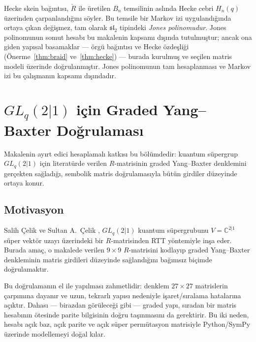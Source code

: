 \documentclass[10pt]{math}
\numberwithin{equation}{section}
\theoremstyle{plain}
\theoremstyle{definition}
\renewcommand{\sl}{\mathfrak{sl}}
\begin{document}
Hecke skein bağıntısı, $\check R$ ile üretilen $B_n$ temsilinin aslında Hecke
cebri $H_n(q)$ üzerinden çarpanlandığını söyler. Bu temsile bir Markov izi
uygulandığında ortaya çıkan değişmez, tam olarak $\sl_2$ tipindeki
\emph{Jones polinomudur}. Jones polinomunun somut hesabı bu makalenin kapsamı
dışında tutulmuştur; ancak ona giden yapısal basamaklar --- örgü bağıntısı ve
Hecke özdeşliği (Önerme~\ref{thm:braid} ve~\ref{thm:hecke}) --- burada kurulmuş
ve seçilen matris modeli üzerinde doğrulanmıştır. Jones polinomunun tam
hesaplanması ve Markov izi bu çalışmanın kapsamı dışındadır.

\section{$GL_q(2|1)$ için Graded Yang--Baxter Doğrulaması}

Makalenin ayırt edici hesaplamalı katkısı bu bölümdedir: kuantum süpergrup
$GL_q(2|1)$ için literatürde verilen $R$-matrisinin graded Yang--Baxter
denklemini gerçekten sağladığı, sembolik matris doğrulamasıyla bütün girdiler
düzeyinde ortaya konur.

\subsection{Motivasyon}

Salih Çelik ve Sultan A.\ Çelik \cite{CelikGL21}, $GL_q(2|1)$ kuantum süpergrubunu
$V=\mathbb{C}^{2|1}$ süper vektör uzayı üzerindeki bir $R$-matrisinden RTT
yöntemiyle inşa eder. Burada amaç, o makalede verilen $9\times 9$ $R$-matrisini
kodlayıp graded Yang--Baxter denkleminin matris girdileri düzeyinde sağlandığını
bağımsız biçimde doğrulamaktır.

Bu doğrulamanın el ile yapılması zahmetlidir: denklem $27\times 27$ matrislerin
çarpımına dayanır ve uzun, tekrarlı yapısı nedeniyle işaret/sıralama hatalarına
açıktır. Dahası --- birazdan görüleceği gibi --- graded yapı, sıradan bir
matris hesabının ötesinde parite bilgisinin doğru taşınmasını da gerektirir. Bu
iki neden, hesabı açık baz, açık parite ve açık süper permütasyon matrisiyle
Python/SymPy üzerinde modellemeyi doğal kılar.
\end{document}
